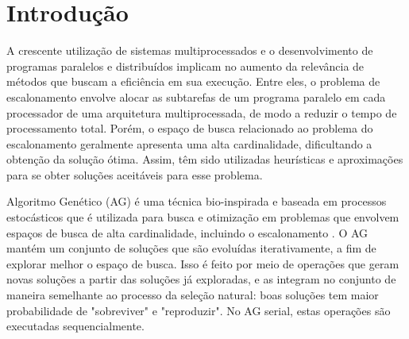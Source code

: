 \documentclass[fleqn,10pt]{SelfArx} %
\affiliation{
\textit{Faculdade de Computação, Universidade Federal de Uberlândia, Brasil}}
\affiliation{*\textbf{Corresponding author}: brunowelldm@gmail.com}
\begin{document}
\setcounter{page}{11}

\flushbottom %
\maketitle %
\thispagestyle{empty} %







\section{Introdução} %

A crescente utilização de sistemas multiprocessados e o desenvolvimento de programas paralelos e distribuídos implicam no aumento da relevância de métodos que buscam a eficiência em sua execução. Entre eles, o problema de escalonamento envolve alocar as subtarefas de um programa paralelo em cada processador de uma arquitetura multiprocessada, de modo a reduzir o tempo de processamento total. Porém, o espaço de busca relacionado ao problema do escalonamento geralmente apresenta uma alta cardinalidade, dificultando a obtenção da solução ótima. Assim, têm sido utilizadas heurísticas e aproximações para se obter soluções aceitáveis para esse problema. \cite{Hou1994, Goldberg}

Algoritmo Genético (AG) é uma técnica bio-inspirada e baseada em processos estocásticos que é utilizada para busca e otimização em problemas que envolvem espaços de busca de alta cardinalidade, incluindo o escalonamento \cite{Goldberg:1989:GAS:534133}. O AG mantém um conjunto de soluções que são evoluídas iterativamente, a fim de explorar melhor o espaço de busca. Isso é feito por meio de operações que geram novas soluções a partir das soluções já exploradas, e as integram no conjunto de maneira semelhante ao processo da seleção natural: boas soluções tem maior probabilidade de "sobreviver" e "reproduzir". No AG serial, estas operações são executadas sequencialmente.
\end{document}
